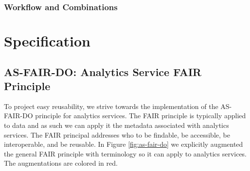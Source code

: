 \documentclass[12pt]{article}
\begin{document}
\subsubsection{Workflow and Combinations}






\section{Specification}


\subsection{AS-FAIR-DO: Analytics Service FAIR Principle}

To project easy reusability, we strive towards the implementation of the AS-FAIR-DO principle for analytics services. The FAIR principle is typically applied to data and as such we can apply it the metadata associated with analytics services. The FAIR principal addresses who to be findable, be accessible, be interoperable, and be reusable. In Figure \ref{fig:as-fair-do} we explicitly augmented the general FAIR principle with terminology so it can apply to analytics services. The augmentations are colored in red.
\end{document}
